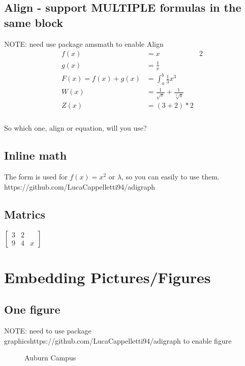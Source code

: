 \documentclass{article}
\begin{document}
  \subsection{Align - support MULTIPLE formulas in the same block}
  NOTE: need use package amsmath to enable Align 
  \begin{align*}
    f(x) &= x & 2 \\
    g(x) &= \frac{1}{x} \\
    F(x) = f(x) + g(x) &= \int_{a}^{b} \frac{1}{3}x^3 \\
    W(x) &= \frac{1}{\sqrt{x}} + \frac{1}{\sqrt[3]{y}} \\
    Z(x) &= \left( 3 + 2 \right) * 2
  \end{align*}
  \subsubsection{}
  So which one, align or equation, will you use?


  \subsection{Inline math}
  The form is used for $ f(x) = x^ 2 $ or $\lambda$, so you can easily to use them. 
  https://github.com/LucaCappelletti94/adigraph
  \subsection{Matrics}
  $
  \left[
  \begin{matrix}
    3 & 2 \\
    9 & 4 & x
  \end{matrix}
  \right]
  $

  \newpage


  \section{Embedding Pictures/Figures}

  \subsection{One figure}
  NOTE: need to use package graphicshttps://github.com/LucaCappelletti94/adigraph to enable figure

  \begin{figure}[h!]
    \caption{Auburn Campus}
    \label{fig:au01}
  \end{figure}
\end{document}
